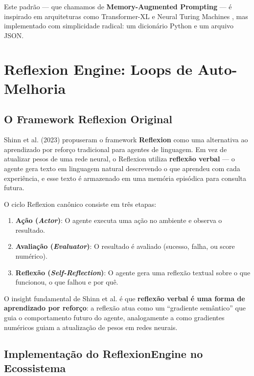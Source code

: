 Este padrão — que chamamos de \textbf{Memory-Augmented Prompting} — é inspirado em arquiteturas como Transformer-XL \cite{Dai2019_TransformerXL} e Neural Turing Machines \cite{Rae2016_DNC}, mas implementado com simplicidade radical: um dicionário Python e um arquivo JSON.

\section{Reflexion Engine: Loops de Auto-Melhoria}
\label{sec:reflexion}

\subsection{O Framework Reflexion Original}

Shinn et al. (2023) \cite{Shinn2023_Reflexion} propuseram o framework \textbf{Reflexion} como uma alternativa ao aprendizado por reforço tradicional para agentes de linguagem. Em vez de atualizar pesos de uma rede neural, o Reflexion utiliza \textbf{reflexão verbal} — o agente gera texto em linguagem natural descrevendo o que aprendeu com cada experiência, e esse texto é armazenado em uma memória episódica para consulta futura.

O ciclo Reflexion canônico consiste em três etapas:

\begin{enumerate}
    \item \textbf{Ação (\textit{Actor})}: O agente executa uma ação no ambiente e observa o resultado.
    \item \textbf{Avaliação (\textit{Evaluator})}: O resultado é avaliado (sucesso, falha, ou score numérico).
    \item \textbf{Reflexão (\textit{Self-Reflection})}: O agente gera uma reflexão textual sobre o que funcionou, o que falhou e por quê.
\end{enumerate}

O insight fundamental de Shinn et al. é que \textbf{reflexão verbal é uma forma de aprendizado por reforço}: a reflexão atua como um ``gradiente semântico'' que guia o comportamento futuro do agente, analogamente a como gradientes numéricos guiam a atualização de pesos em redes neurais.

\subsection{Implementação do ReflexionEngine no Ecossistema}

